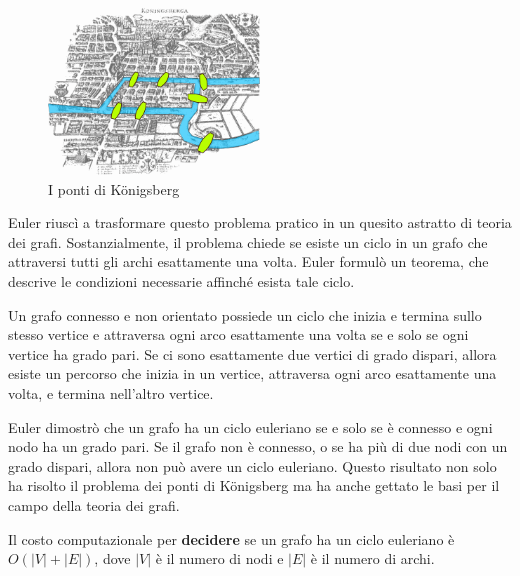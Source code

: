 \begin{figure}[ht]
    \centering
    \includegraphics[width=0.5\textwidth]{img/Konigsberg_bridges.png}
    \caption{I ponti di Königsberg}
    \label{fig:konigsberg_bridges}
\end{figure}

Euler riuscì a trasformare questo problema pratico in un quesito astratto di teoria dei grafi. Sostanzialmente, il problema chiede se esiste un ciclo in un grafo che attraversi tutti gli archi esattamente una volta. Euler formulò un teorema, che descrive le condizioni necessarie affinché esista tale ciclo.

\begin{pastelbox2}[title=Teorema di Euler]
    Un grafo connesso e non orientato possiede un ciclo che inizia e termina sullo
    stesso vertice e attraversa ogni arco esattamente una volta se e solo se ogni
    vertice ha grado pari. Se ci sono esattamente due vertici di grado dispari, allora
    esiste un percorso che inizia in un vertice, attraversa ogni arco esattamente una volta,
    e termina nell'altro vertice.
\end{pastelbox2}
Euler dimostrò che un grafo ha un ciclo euleriano se e solo se è connesso e
ogni nodo ha un grado pari. Se il grafo non è connesso, o se ha più di due nodi
con un grado dispari, allora non può avere un ciclo euleriano. Questo risultato non
solo ha risolto il problema dei ponti di Königsberg ma ha anche gettato le basi per il
campo della teoria dei grafi.

Il costo computazionale per \textbf{decidere} se un grafo ha un ciclo euleriano è
$O(|V|+|E|)$, dove $|V|$ è il numero di nodi e $|E|$ è il numero di archi. 

